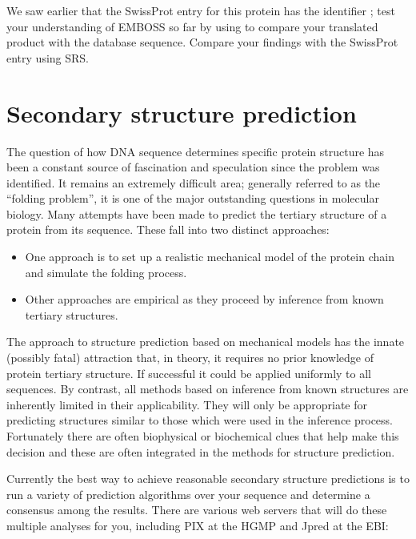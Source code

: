 \documentclass[12pt]{report}
\begin{document}
We saw earlier that the	SwissProt entry	for this protein has the
identifier ; test your	understanding of EMBOSS	so
far by using  to compare your translated product with
the database sequence. Compare your findings with the SwissProt
 entry using SRS.

\section{Secondary structure prediction}

The question of	how DNA	sequence determines specific protein structure
has been a constant source of fascination and speculation since	the
problem	was identified.	It remains an extremely	difficult area;
generally referred to as the ``folding problem'', it is	one of the major
outstanding questions in molecular biology. Many attempts
have been made to predict the tertiary structure of a protein from its
sequence. These	fall into two distinct approaches:

\begin{itemize}
\item One approach is to set up	a realistic mechanical model of
the protein chain and simulate the
folding	process.
\item Other approaches are empirical as	they proceed by	inference
from known tertiary structures.
\end{itemize}

The approach to	structure prediction based on mechanical models	has
the innate (possibly fatal) attraction that, in	theory,	it requires no
prior knowledge	of protein tertiary structure. If successful it	could
be applied uniformly to	all sequences. By contrast, all	methods	based
on inference from known	structures are inherently limited in their
applicability. They will only be appropriate for predicting structures
similar	to those which were used in the	inference process.
Fortunately there are often biophysical	or biochemical clues that help
make this decision and these are often integrated in the methods for
structure prediction.

Currently the best way to achieve reasonable secondary structure
predictions is to run a	variety	of prediction algorithms over your
sequence and determine a consensus among the results. There are
various	web servers that will do these multiple	analyses for you,
including PIX at the HGMP and Jpred at the EBI:

\noindent{}\\
\end{document}
